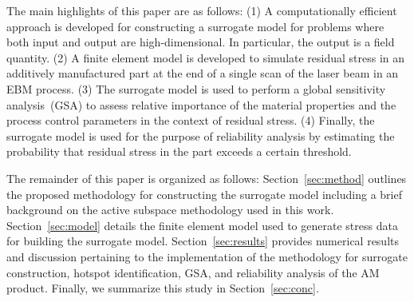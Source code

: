 The main highlights of this paper are as follows: (1) A computationally efficient approach is developed
for constructing a surrogate model for problems where both input and output are high-dimensional.
In particular, the output is a field quantity. 
(2) A finite element model is developed to simulate residual stress in an additively manufactured part
at the end of a single scan of the laser beam in an EBM process. (3) The surrogate model is used to perform a global
sensitivity analysis~(GSA) to assess relative importance of the material properties and the process control parameters
in the context of residual stress. (4) Finally, the surrogate model is used for the purpose of reliability analysis by estimating the
probability that residual stress in the part exceeds a certain threshold.

The remainder of this paper is organized as follows: Section~\ref{sec:method} outlines the proposed methodology for
constructing the surrogate model including a brief background on the active subspace methodology used in this work.
Section~\ref{sec:model} details the finite element model used to generate stress data for building the surrogate model.
Section~\ref{sec:results} provides numerical results and discussion pertaining to the implementation of the methodology 
for surrogate construction, hotspot identification, GSA, and 
reliability analysis of the AM product. 
Finally, we summarize this study in Section~\ref{sec:conc}. 



